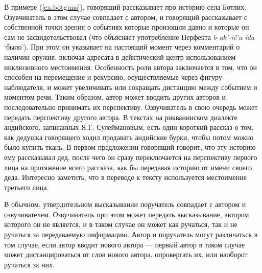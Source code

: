 
В примере (\ref{ex:botguns}), говорящий рассказывает про историю села Ботлих. Озувчиватель в этом случае совпадает с автором, и говорящий рассказывает с собственной точки зрения о событиях которые произошли давно и которые он сам не засвидетельствовал (что объясняет употребление Перфекта \textit{b-uk’-ič’a ida} `было’). При этом он указывает на настоящий момент через комментарий о наличии оружия, включая адресата в дейктический центр использованием инклюзивного местоимения. Особенность роли автора заключается в том, что он способен на перемещение и рекурсию, осуществляемые через фигуру наблюдателя, и может увеличивать или сокращать дистанцию между событием и моментом речи. Таким образом, автор может вводить других авторов и последовательно принимать их перспективу. Озвучиватель в свою очередь может передать перспективу другого автора. В текстах на рикванинском диалекте андийского, записанных Я.Г. Сулеймановым, есть один короткий рассказ о том, как дедушка говорящего ходил продавать андийские бурки, чтобы потом можно было купить ткань. В первом предложении говорящий говорит, что эту историю ему рассказывал дед, после чего он сразу переключается на перспективу первого лица на протяжение всего рассказа, как бы передавая историю от имени своего деда. Интересно заметить, что в переводе к тексту используется местоимение третьего лица.


В обычном, утвердительном высказывании поручатель совпадает с автором и озвучивателем. Озвучиватель при этом может передать высказывание, автором которого он не является, и в таком случае он может как ручаться, так и не ручаться за передаваемую информацию. Автор и поручатель могут различаться в том случае, если автор вводит нового автора --- первый автор в таком случае может дистанцироваться от слов нового автора, опровергать их, или наоборот ручаться за них.

